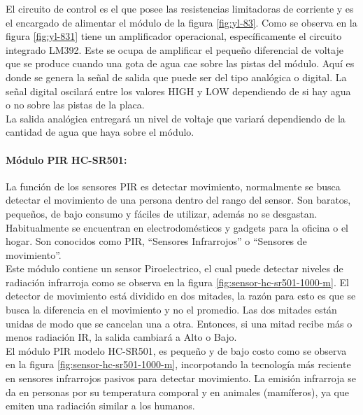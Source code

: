 El circuito de control es el que posee las resistencias limitadoras de corriente y es el encargado de alimentar el módulo de la figura \ref{fig:yl-83}. Como se observa en la figura \ref{fig:yl-831} tiene un amplificador operacional, específicamente el circuito integrado LM392. Este se ocupa de amplificar el pequeño diferencial de voltaje que se produce cuando una gota de agua cae sobre las pistas del módulo. Aquí es donde se genera la señal de salida que puede ser del tipo analógica o digital. La señal digital oscilará entre los valores HIGH y LOW dependiendo de si hay agua o no sobre las pistas de la placa.\\

La salida analógica entregará un nivel de voltaje que variará dependiendo de la cantidad de agua que haya sobre el módulo.\cite{LLU}\\


\paragraph{Módulo PIR HC-SR501: }

La función de los sensores PIR es detectar movimiento, normalmente se busca detectar el movimiento de una persona dentro del rango del sensor. Son baratos, pequeños, de bajo consumo y fáciles de utilizar, además no se desgastan. Habitualmente se encuentran en electrodomésticos y gadgets para la oficina o el hogar. Son conocidos como PIR, ``Sensores Infrarrojos'' o ``Sensores de movimiento''.\\

Este módulo contiene un sensor Piroelectrico, el cual puede detectar niveles de radiación infrarroja como se observa en la figura \ref{fig:sensor-hc-sr501-1000-m}. El detector de movimiento está dividido en dos mitades, la razón para esto es que se busca la diferencia en el movimiento y no el promedio. Las dos mitades están unidas de modo que se cancelan una a otra. Entonces, si una mitad recibe más o menos radiación IR, la salida cambiará a Alto o Bajo. \cite{PIR1}\\

El módulo PIR modelo HC-SR501, es pequeño y de bajo costo como se observa en la figura \ref{fig:sensor-hc-sr501-1000-m}, incorpotando la tecnología más reciente en sensores infrarrojos pasivos para detectar movimiento. La emisión infrarroja se da en personas por su temperatura comporal y en animales (mamíferos), ya que emiten una radiación similar a los humanos. \cite{PIR2}

